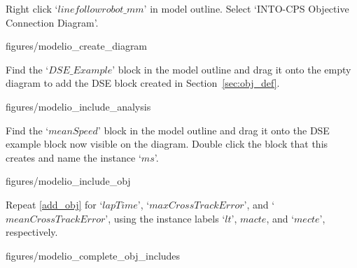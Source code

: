 \documentclass[11pt,a4paper]{../tutorial}
\begin{document}
\begin{instructions}

\item Right click `$linefollowrobot\_mm$' in model outline. Select `INTO-CPS \menusep Objective Connection Diagram'.

\begin{center}
\begin{annotation}[width=0.7\linewidth]{figures/modelio_create_diagram}
    \end{annotation}
\end{center}

\item Find the `$DSE\_Example$' block in the model outline and drag it onto the empty diagram to add the DSE block created in Section~\ref{sec:obj_def}.

\begin{center}
\begin{annotation}[width=0.7\linewidth]{figures/modelio_include_analysis}
    \end{annotation}
\end{center}

\newpage

\item \label{add_obj} Find the `$meanSpeed$' block in the model outline and drag it onto the DSE example block now visible on the diagram. Double click the block that this creates and name the instance `$ms$'.

\begin{center}
\begin{annotation}[width=0.7\linewidth]{figures/modelio_include_obj}
    \end{annotation}
\end{center}

\item Repeat \ref{add_obj} for `$lapTime$', `$maxCrossTrackError$', and `$meanCrossTrackError$', using the instance labels `$lt$', $macte$, and `$mecte$', respectively.

\begin{center}
\begin{annotation}[width=0.7\linewidth]{figures/modelio_complete_obj_includes}
    \end{annotation}
\end{center}


\end{instructions}
\end{document}
